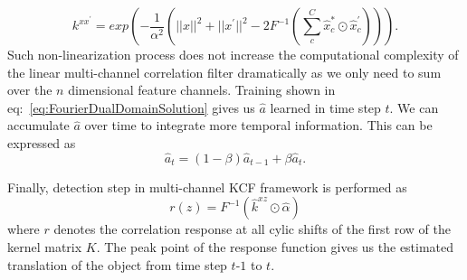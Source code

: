 \documentclass[10pt,twocolumn,letterpaper]{article}
\newcounter{ct}
\begin{document}
\begin{equation}
k^{xx^{'}} = exp(-\dfrac{1}{\alpha^{2}}(||x||^{2}+||x^{'}||^{2}-2F^{-1}(\sum^{C}_{c}\hat{x}_{c}^{*}\odot \hat{x}_{c}^{'}))).
\label{eq:GaussianCorrelationSingleChannel}
\end{equation}
Such non-linearization process does not increase the computational complexity of the linear multi-channel correlation filter dramatically as we only need to sum over the $n$ dimensional feature channels. Training shown in eq:~\ref{eq:FourierDualDomainSolution} gives us $\hat{a}$ learned in time step $t$. We can accumulate $\hat{a}$ over time to integrate more temporal information. This can be expressed as
\begin{equation}
\hat{a}_{t} = (1-\beta)\hat{a}_{t-1} + \beta\hat{a}_{t}. 
\end{equation}

Finally, detection step in multi-channel KCF framework is performed as
\begin{equation}
r(z) = F^{-1}(\hat{k}^{xz} \odot \hat{\alpha})
\end{equation}
where $r$ denotes the correlation response at all cylic shifts of the first row of the kernel matrix $K$. The peak point of the response function gives us the estimated translation of the object from time step $t$-$1$ to $t$.
\end{document}
